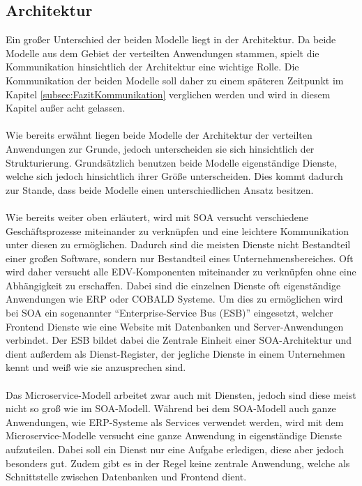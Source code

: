 \subsection{Architektur}
\label{subsec:FazitArchitektur}
Ein großer Unterschied der beiden Modelle liegt in der Architektur. Da beide Modelle aus dem Gebiet der verteilten Anwendungen stammen, spielt die Kommunikation hinsichtlich der Architektur eine wichtige Rolle. Die Kommunikation der beiden Modelle soll daher zu einem späteren Zeitpunkt im Kapitel \ref{subsec:FazitKommunikation}  verglichen werden und wird in diesem Kapitel außer acht gelassen.
\\\\
Wie bereits erwähnt liegen beide Modelle der Architektur der verteilten Anwendungen zur Grunde, jedoch unterscheiden sie sich hinsichtlich der Strukturierung. Grundsätzlich benutzen beide Modelle eigenständige Dienste, welche sich jedoch hinsichtlich ihrer Größe unterscheiden. Dies kommt dadurch zur Stande, dass beide Modelle einen unterschiedlichen Ansatz besitzen.
\\\\
Wie bereits weiter oben erläutert, wird mit SOA versucht verschiedene Geschäftsprozesse miteinander zu verknüpfen und eine leichtere Kommunikation unter diesen zu ermöglichen. Dadurch sind die meisten Dienste nicht  Bestandteil einer großen Software, sondern nur Bestandteil eines Unternehmensbereiches. Oft wird daher versucht alle EDV-Komponenten miteinander zu verknüpfen ohne eine Abhängigkeit zu erschaffen. Dabei sind die einzelnen Dienste oft eigenständige Anwendungen wie ERP oder COBALD Systeme. Um dies zu ermöglichen wird bei SOA ein sogenannter "`Enterprise-Service Bus (ESB)"' eingesetzt, welcher Frontend Dienste wie eine Website mit Datenbanken und Server-Anwendungen verbindet. Der ESB bildet dabei die Zentrale Einheit einer SOA-Architektur und dient außerdem als Dienst-Register, der jegliche Dienste in einem Unternehmen kennt und weiß wie sie anzusprechen sind.
\\\\
Das Microservice-Modell arbeitet zwar auch mit Diensten, jedoch sind diese meist nicht so groß wie im SOA-Modell. Während bei dem SOA-Modell auch ganze Anwendungen, wie ERP-Systeme als Services verwendet werden, wird mit dem Microservice-Modelle versucht eine ganze Anwendung in eigenständige  Dienste aufzuteilen. Dabei soll ein Dienst nur eine Aufgabe erledigen, diese aber jedoch besonders gut. Zudem gibt es in der Regel keine zentrale Anwendung, welche als Schnittstelle zwischen Datenbanken und Frontend dient.

